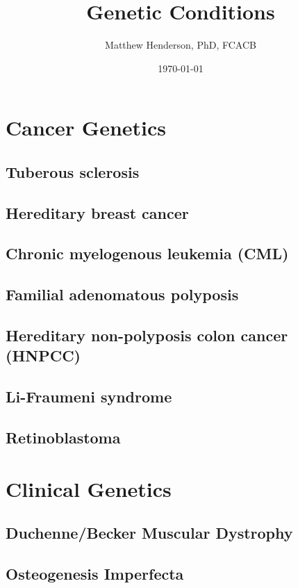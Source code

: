 \documentclass{scrartcl}
\author{Matthew Henderson, PhD, FCACB}
\date{\today}
\title{Genetic Conditions}
\begin{document}
\maketitle
\setcounter{tocdepth}{1}
\tableofcontents


\section{Cancer Genetics}
\label{sec:orgb465018}
\subsection{Tuberous sclerosis}
\label{sec:org09128bb}
\subsection{Hereditary breast cancer}
\label{sec:org42eb8b7}
\subsection{Chronic myelogenous leukemia (CML)}
\label{sec:org4371922}
\subsection{Familial adenomatous polyposis}
\label{sec:org15e880b}
\subsection{Hereditary non-polyposis colon cancer (HNPCC)}
\label{sec:org4617222}
\subsection{Li-Fraumeni syndrome}
\label{sec:org7c56a24}
\subsection{Retinoblastoma}
\label{sec:org1b5b534}

\section{Clinical Genetics}
\label{sec:org3eaf58e}
\subsection{Duchenne/Becker Muscular Dystrophy}
\label{sec:org8954a7e}
\subsection{Osteogenesis Imperfecta}
\label{sec:orgb2f589f}
\end{document}

